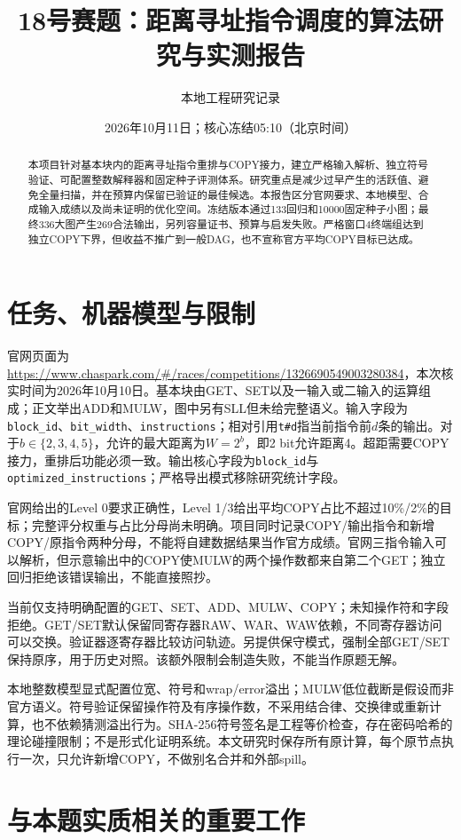 \documentclass[UTF8,11pt,fontset=fandol]{ctexart}
\title{18号赛题：距离寻址指令调度的算法研究与实测报告}
\author{本地工程研究记录}
\date{2026年10月11日；核心冻结05:10（北京时间）}
\begin{document}
\maketitle
\begin{abstract}
本项目针对基本块内的距离寻址指令重排与COPY接力，建立严格输入解析、独立符号验证、可配置整数解释器和固定种子评测体系。研究重点是减少过早产生的活跃值、避免全量扫描，并在预算内保留已验证的最佳候选。本报告区分官网要求、本地模型、合成输入成绩以及尚未证明的优化空间。冻结版本通过133回归和10000固定种子小图；最终336大图产生269合法输出，另列容量证书、预算与启发失败。严格窗口4终端组达到独立COPY下界，但收益不推广到一般DAG，也不宣称官方平均COPY目标已达成。
\end{abstract}

\section{任务、机器模型与限制}
官网页面为\url{https://www.chaspark.com/#/races/competitions/1326690549003280384}，本次核实时间为2026年10月10日。基本块由GET、SET以及一输入或二输入的运算组成；正文举出ADD和MULW，图中另有SLL但未给完整语义。输入字段为\texttt{block\_id}、\texttt{bit\_width}、\texttt{instructions}；相对引用\texttt{t\#d}指当前指令前$d$条的输出。对于$b\in\{2,3,4,5\}$，允许的最大距离为$W=2^b$，即2 bit允许距离4。超距需要COPY接力，重排后功能必须一致。输出核心字段为\texttt{block\_id}与\texttt{optimized\_instructions}；严格导出模式移除研究统计字段。

官网给出的Level 0要求正确性，Level 1/3给出平均COPY占比不超过10\%/2\%的目标；完整评分权重与占比分母尚未明确。项目同时记录COPY/输出指令和新增COPY/原指令两种分母，不能将自建数据结果当作官方成绩。官网三指令输入可以解析，但示意输出中的COPY使MULW的两个操作数都来自第二个GET；独立回归拒绝该错误输出，不能直接照抄。

当前仅支持明确配置的GET、SET、ADD、MULW、COPY；未知操作符和字段拒绝。GET/SET默认保留同寄存器RAW、WAR、WAW依赖，不同寄存器访问可以交换。验证器逐寄存器比较访问轨迹。另提供保守模式，强制全部GET/SET保持原序，用于历史对照。该额外限制会制造失败，不能当作原题无解。

本地整数模型显式配置位宽、符号和wrap/error溢出；MULW低位截断是假设而非官方语义。符号验证保留操作符及有序操作数，不采用结合律、交换律或重新计算，也不依赖猜测溢出行为。SHA-256符号签名是工程等价检查，存在密码哈希的理论碰撞限制；不是形式化证明系统。本文研究时保存所有原计算，每个原节点执行一次，只允许新增COPY，不做别名合并和外部spill。

\section{与本题实质相关的重要工作}
\end{document}
